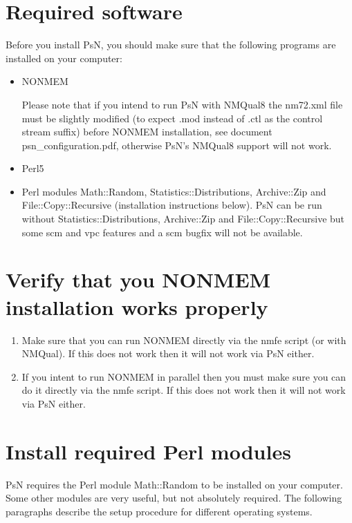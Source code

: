 


\maketitle

\section{Required software}
Before you install PsN, you should make sure that the following programs are installed on your computer:
\begin{itemize}
\item NONMEM 

Please note that if you intend to run PsN with NMQual8 the nm72.xml file must be slightly modified (to expect .mod instead of .ctl as the control stream suffix) before NONMEM installation, see document psn\_configuration.pdf, otherwise PsN's NMQual8 support will not work.
	\item Perl5
	\item Perl modules Math::Random, Statistics::Distributions, Archive::Zip and File::Copy::Recursive (installation instructions below). PsN can be run without Statistics::Distributions, Archive::Zip and File::Copy::Recursive but some scm and vpc features and a scm bugfix will not be available.
\end{itemize}

\section{Verify that you NONMEM installation works properly}
\begin{enumerate}
\item Make sure that you can run NONMEM directly via the nmfe script (or with NMQual). If this does not work then it will not work via PsN either.
\item If you intent to run NONMEM in parallel then you must make sure you can do it directly via the nmfe script. If this does not work then it will not work via PsN either.
\end{enumerate}

\section{Install required Perl modules}
PsN requires the Perl module Math::Random to be installed on your computer. Some other modules are very useful, but not absolutely required. The following paragraphs describe the setup procedure for different operating systems. 
